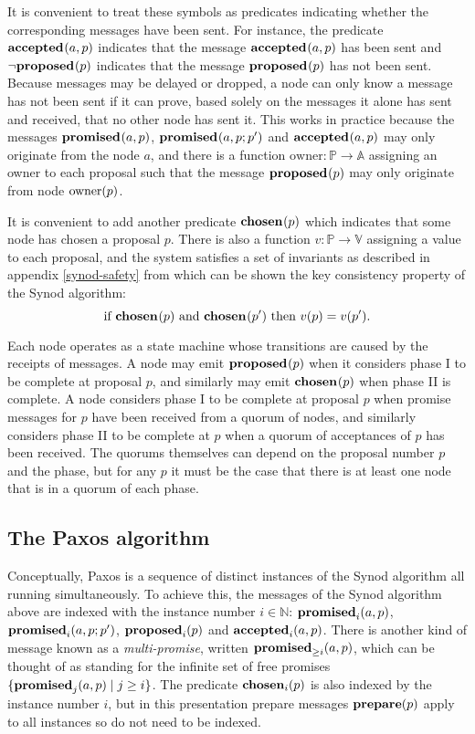 \documentclass[journal]{IEEEtran}
\begin{document}
It is convenient to treat these symbols as predicates indicating whether the
corresponding messages have been sent. For instance, the predicate
$\mathbf{accepted}_{}(a,p)$ indicates that the message $\mathbf{accepted}_{}(a,p)$ has been sent and
$\neg \mathbf{proposed}_{}(p)$ indicates that the message $\mathbf{proposed}_{}(p)$ has not been sent.
Because messages may be delayed or dropped, a node can only know a message has
not been sent if it can prove, based solely on the messages it alone has sent
and received, that no other node has sent it. This works in practice because
the messages $\mathbf{promised}_{}(a,p)$, $\mathbf{promised}_{}(a,p;p')$ and $\mathbf{accepted}_{}(a,p)$ may only
originate from the node $a$, and there is a function $\mathrm{owner} : \mathbb
P \to \mathbb A$ assigning an owner to each proposal such that the message
$\mathbf{proposed}_{}(p)$ may only originate from node $\mathrm{owner}(p)$.

It is convenient to add another predicate $\mathbf{chosen}_{}(p)$ which indicates that
some node has chosen a proposal $p$. There is also a function $v : \mathbb P
\to \mathbb V$ assigning a value to each proposal, and the system satisfies a
set of invariants as described in appendix \ref{synod-safety} from which can be
shown the key consistency property of the Synod algorithm: \[\textrm{if }
\mathbf{chosen}_{}(p) \textrm{ and } \mathbf{chosen}_{}(p') \textrm { then } v(p) = v(p').\]

Each node operates as a state machine whose transitions are caused by the
receipts of messages. A node may emit $\mathbf{proposed}_{}(p)$ when it considers phase I to
be complete at proposal $p$, and similarly may emit $\mathbf{chosen}_{}(p)$ when phase
II is complete.  A node considers phase I to be complete at proposal $p$ when
promise messages for $p$ have been received from a quorum of nodes, and
similarly considers phase II to be complete at $p$ when a quorum of acceptances
of $p$ has been received. The quorums themselves can depend on the proposal
number $p$ and the phase, but for any $p$ it must be the case that there is at
least one node that is in a quorum of each phase.

\subsection{The Paxos algorithm}

Conceptually, Paxos is a sequence of distinct instances of the Synod algorithm
all running simultaneously. To achieve this, the messages of the Synod
algorithm above are indexed with the instance number $i \in \mathbb N$:
$\mathbf{promised}_{i}(a,p)$, $\mathbf{promised}_{i}(a,p;p')$, $\mathbf{proposed}_{i}(p)$ and $\mathbf{accepted}_{i}(a,p)$.
There is another kind of message known as a \textit{multi-promise}, written
$\mathbf{promised}_{\ge i}(a,p)$, which can be thought of as standing for the infinite set of
free promises ${\{ \mathbf{promised}_{j}(a,p) \mid j \ge i \}}$. The predicate
$\mathbf{chosen}_{i}(p)$ is also indexed by the instance number $i$, but in this
presentation prepare messages $\mathbf{prepare}(p)$ apply to all instances so do not need
to be indexed.
\end{document}
